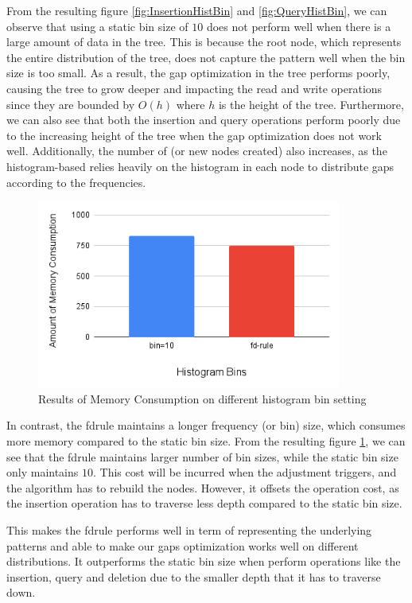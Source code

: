 From the resulting figure \ref{fig:InsertionHistBin} and \ref{fig:QueryHistBin}, we can observe that using a static bin size of $10$ does not perform well when there is a large amount of data in the tree. This is because the root node, which represents the entire distribution of the tree, does not capture the pattern well when the bin size is too small. As a result, the gap optimization in the tree performs poorly, causing the tree to grow deeper and impacting the read and write operations since they are bounded by $O(h)$ where $h$ is the height of the tree. Furthermore, we can also see that both the insertion and query operations perform poorly due to the increasing height of the tree when the gap optimization does not work well. Additionally, the number of \conflict (or new nodes created) also increases, as the histogram-based \learnindex relies heavily on the histogram in each node to distribute gaps according to the frequencies.
\begin{figure}[H]
    \centering
    \includegraphics[width=100mm,scale=1]{Figures/MemoryHistBin.png}
    \caption{
     Results of Memory Consumption on different histogram bin setting
    }
    \label{fig:MemoryHistBin}
\end{figure}
In contrast, the \acrshort{fdrule} maintains a longer frequency (or bin) size, which consumes more memory compared to the static bin size. From the resulting figure \ref{fig:MemoryHistBin}, we can see that the \acrshort{fdrule} maintains larger number of bin sizes, while the static bin size only maintains $10$. This cost will be incurred when the adjustment triggers, and the algorithm has to rebuild the nodes. However, it offsets the operation cost, as the insertion operation has to traverse less depth compared to the static bin size. 

This makes the \acrshort{fdrule} performs well in term of representing the underlying patterns and able to make our gaps optimization works well on different distributions. It outperforms the static bin size when perform operations like the insertion, query and deletion due to the smaller depth that it has to traverse down.


